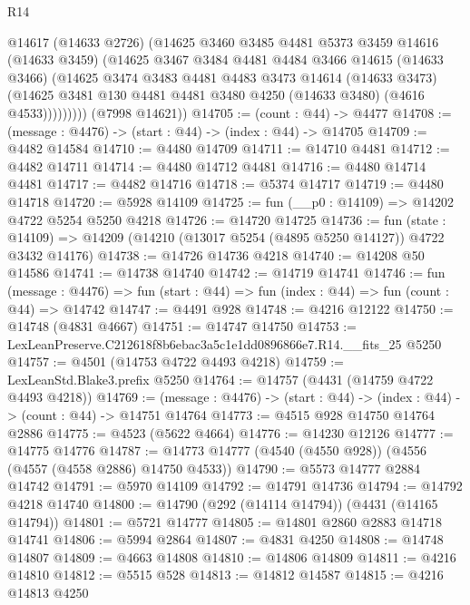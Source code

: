 \begin{lexlean}{R14}
\begin{coremodule}
              @14617
              (@14633 @2726)
              (@14625
                @3460
                @3485
                @4481
                @5373
                @3459
                @14616
                (@14633 @3459)
                (@14625
                  @3467
                  @3484
                  @4481
                  @4484
                  @3466
                  @14615
                  (@14633 @3466)
                  (@14625
                    @3474
                    @3483
                    @4481
                    @4483
                    @3473
                    @14614
                    (@14633 @3473)
                    (@14625 @3481 @130 @4481 @4481 @3480 @4250 (@14633 @3480) (@4616 @4533)))))))))
      (@7998 @14621))
@14705 := (count : @44) -> @4477
@14708 := (message : @4476) -> (start : @44) -> (index : @44) -> @14705
@14709 := @4482 @14584
@14710 := @4480 @14709
@14711 := @14710 @4481
@14712 := @4482 @14711
@14714 := @4480 @14712 @4481
@14716 := @4480 @14714 @4481
@14717 := @4482 @14716
@14718 := @5374 @14717
@14719 := @4480 @14718
@14720 := @5928 @14109
@14725 := fun (__p0 : @14109) => @14202 @4722 @5254 @5250 @4218
@14726 := @14720 @14725
@14736 := fun (state : @14109) =>
  @14209 (@14210 (@13017 @5254 (@4895 @5250 @14127)) @4722 @3432 @14176)
@14738 := @14726 @14736 @4218
@14740 := @14208 @50 @14586
@14741 := @14738 @14740
@14742 := @14719 @14741
@14746 := fun (message : @4476) =>
  fun (start : @44) => fun (index : @44) => fun (count : @44) => @14742
@14747 := @4491 @928
@14748 := @4216 @12122
@14750 := @14748 (@4831 @4667)
@14751 := @14747 @14750
@14753 := LexLeanPreserve.C212618f8b6ebac3a5c1e1dd0896866e7.R14.__fits_25 @5250
@14757 := @4501 (@14753 @4722 @4493 @4218)
@14759 := LexLeanStd.Blake3.prefix @5250
@14764 := @14757 (@4431 (@14759 @4722 @4493 @4218))
@14769 := (message : @4476) -> (start : @44) -> (index : @44) -> (count : @44) -> @14751 @14764
@14773 := @4515 @928 @14750 @14764 @2886
@14775 := @4523 (@5622 @4664)
@14776 := @14230 @12126
@14777 := @14775 @14776
@14787 := @14773 @14777 (@4540 (@4550 @928)) (@4556 (@4557 (@4558 @2886) @14750 @4533))
@14790 := @5573 @14777 @2884 @14742
@14791 := @5970 @14109
@14792 := @14791 @14736
@14794 := @14792 @4218 @14740
@14800 := @14790 (@292 (@14114 @14794)) (@4431 (@14165 @14794))
@14801 := @5721 @14777
@14805 := @14801 @2860 @2883 @14718 @14741
@14806 := @5994 @2864
@14807 := @4831 @4250
@14808 := @14748 @14807
@14809 := @4663 @14808
@14810 := @14806 @14809
@14811 := @4216 @14810
@14812 := @5515 @528
@14813 := @14812 @14587
@14815 := @4216 @14813 @4250

\end{coremodule}
\end{lexlean}
